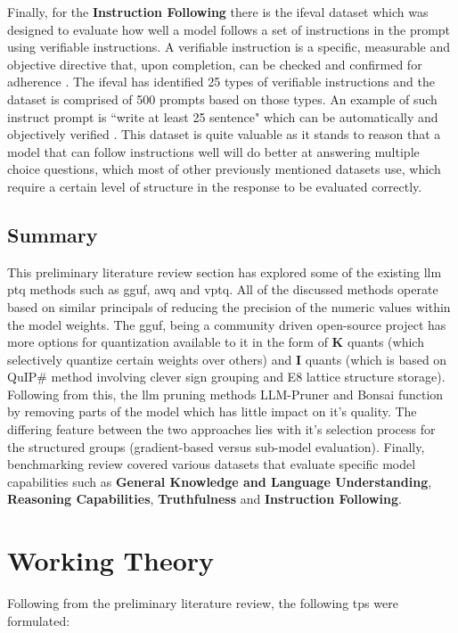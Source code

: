 \documentclass{ifacconf}
\begin{document}
	Finally, for the \textbf{Instruction Following} there is the \gls{ifeval} dataset which was designed to evaluate how well a model follows a set of instructions in the prompt using verifiable instructions. A verifiable instruction is a specific, measurable and objective directive that, upon completion, can be checked and confirmed for adherence \cite{zhou2023instructionfollowingevaluationlargelanguage}. The \gls{ifeval} has identified 25 types of verifiable instructions and the dataset is comprised of 500 prompts based on those types. An example of such instruct prompt is ``write at least 25 sentence" which can be automatically and objectively verified \cite{zhou2023instructionfollowingevaluationlargelanguage}. This dataset is quite valuable as it stands to reason that a model that can follow instructions well will do better at answering multiple choice questions, which most of other previously mentioned datasets use, which require a certain level of structure in the response to be evaluated correctly.
	
	\subsection{Summary}
	This preliminary literature review section has explored some of the existing \gls{llm} \gls{ptq} methods such as \gls{gguf}, \gls{awq} and \gls{vptq}. All of the discussed methods operate based on similar principals of reducing the precision of the numeric values within the model weights. The \gls{gguf}, being a community driven open-source project has more options for quantization available to it in the form of \textbf{K} quants (which selectively quantize certain weights over others) and \textbf{I} quants (which is based on QuIP\# method involving clever sign grouping and E8 lattice structure storage). Following from this, the \gls{llm} pruning methods LLM-Pruner and Bonsai function by removing parts of the model which has little impact on it's quality. The differing feature between the two approaches lies with it's selection process for the structured groups (gradient-based versus sub-model evaluation). Finally, benchmarking review covered various datasets that evaluate specific model capabilities such as \textbf{General Knowledge and Language Understanding}, \textbf{Reasoning Capabilities}, \textbf{Truthfulness} and \textbf{Instruction Following}. 
	
	\section{Working Theory}
	Following from the preliminary literature review, the following \glspl{tp} were formulated:
	
\end{document}
